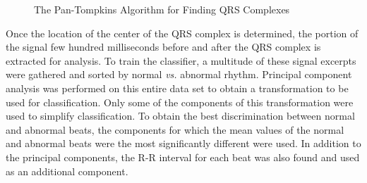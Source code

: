 \documentclass[12pt,letter]{article}
\begin{document}
\begin{figure}[hbtp]
    \centering
    \caption{The Pan-Tompkins Algorithm for Finding QRS Complexes}
    \label{fig:pan}
\end{figure}

Once the location of the center of the QRS complex is determined, the portion of
the signal few hundred milliseconds before and after the QRS complex is
extracted for analysis.  To train the classifier, a multitude of these signal
excerpts were gathered and sorted by normal \textit{vs.} abnormal rhythm.
Principal component analysis was performed on this entire data set to obtain a
transformation to be used for classification.  Only some of the components of
this transformation were used to simplify classification.  To obtain the best
discrimination between normal and abnormal beats, the components for which the
mean values of the normal and abnormal beats were the most significantly
different were used.  In addition to the principal components, the R-R interval
for each beat was also found and used as an additional component.  
\end{document}
